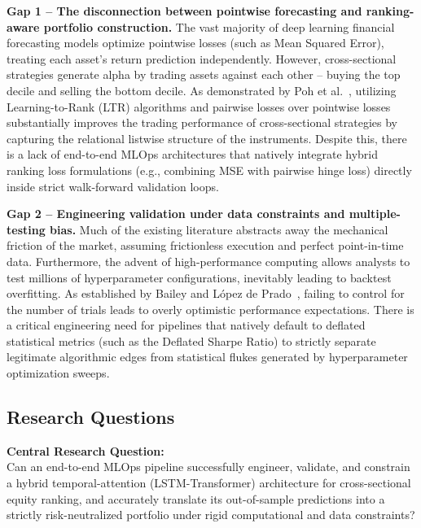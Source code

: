 \textbf{Gap 1 -- The disconnection between pointwise forecasting and ranking-aware portfolio construction.} The vast majority of deep learning financial forecasting models optimize pointwise losses (such as Mean Squared Error), treating each asset's return prediction independently. However, cross-sectional strategies generate alpha by trading assets against each other -- buying the top decile and selling the bottom decile. As demonstrated by Poh et al.~\cite{Poh2020}, utilizing Learning-to-Rank (LTR) algorithms and pairwise losses over pointwise losses substantially improves the trading performance of cross-sectional strategies by capturing the relational listwise structure of the instruments. Despite this, there is a lack of end-to-end \acs{MLOps} architectures that natively integrate hybrid ranking loss formulations (e.g., combining MSE with pairwise hinge loss) directly inside strict walk-forward validation loops.
\label{gap_1}

\bigskip

\textbf{Gap 2 -- Engineering validation under data constraints and multiple-testing bias.} Much of the existing literature abstracts away the mechanical friction of the market, assuming frictionless execution and perfect point-in-time data. Furthermore, the advent of high-performance computing allows analysts to test millions of hyperparameter configurations, inevitably leading to backtest overfitting. As established by Bailey and L\'opez de Prado~\cite{BaileyLopezdePrado2014}, failing to control for the number of trials leads to overly optimistic performance expectations. There is a critical engineering need for pipelines that natively default to deflated statistical metrics (such as the Deflated Sharpe Ratio) to strictly separate legitimate algorithmic edges from statistical flukes generated by hyperparameter optimization sweeps.
\label{gap_2}

\subsection*{Research Questions}
\textbf{Central Research Question:}\\
Can an end-to-end \acs{MLOps} pipeline successfully engineer, validate, and constrain a hybrid temporal-attention (LSTM-Transformer) architecture for cross-sectional equity ranking, and accurately translate its out-of-sample predictions into a strictly risk-neutralized portfolio under rigid computational and data constraints?

\medskip

